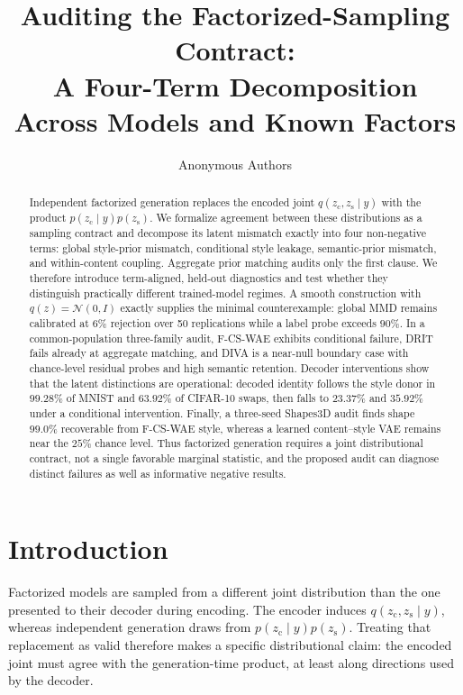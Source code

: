 \documentclass{article}
\title{Auditing the Factorized-Sampling Contract:\\
A Four-Term Decomposition Across Models and Known Factors}
\author{Anonymous Authors}
\newcommand{\zc}{z_{\mathrm{c}}}
\newcommand{\zs}{z_{\mathrm{s}}}
\begin{document}
\maketitle

\begin{abstract}
Independent factorized generation replaces the encoded joint
$q(\zc,\zs\mid y)$ with the product $p(\zc\mid y)p(\zs)$.  We formalize
agreement between these distributions as a sampling contract and decompose
its latent mismatch exactly into four non-negative terms: global style-prior
mismatch, conditional style leakage, semantic-prior mismatch, and
within-content coupling.  Aggregate prior matching audits only the first
clause.  We therefore introduce term-aligned, held-out diagnostics and test
whether they distinguish practically different trained-model regimes.  A
smooth construction with $q(z)=\mathcal N(0,I)$ exactly supplies the minimal
counterexample: global MMD remains calibrated at $6\%$ rejection over 50
replications while a label probe exceeds $90\%$.  In a common-population
three-family audit, F-CS-WAE exhibits conditional failure, DRIT fails already
at aggregate matching, and DIVA is a near-null boundary case with chance-level
residual probes and high semantic retention.  Decoder interventions show that
the latent distinctions are operational: decoded identity follows the style
donor in $99.28\%$ of MNIST and $63.92\%$ of CIFAR-10 swaps, then falls to
$23.37\%$ and $35.92\%$ under a conditional intervention.  Finally, a
three-seed Shapes3D audit finds shape $99.0\%$ recoverable from F-CS-WAE style,
whereas a learned content--style VAE remains near the $25\%$ chance level.
Thus factorized generation requires a joint distributional contract, not a
single favorable marginal statistic, and the proposed audit can diagnose
distinct failures as well as informative negative results.
\end{abstract}

\section{Introduction}
\label{sec:intro}

Factorized models are sampled from a different joint distribution than the
one presented to their decoder during encoding.  The encoder induces
$q(\zc,\zs\mid y)$, whereas independent generation draws from
$p(\zc\mid y)p(\zs)$.  Treating that replacement as valid therefore makes a
specific distributional claim: the encoded joint must agree with the
generation-time product, at least along directions used by the decoder.
\end{document}
